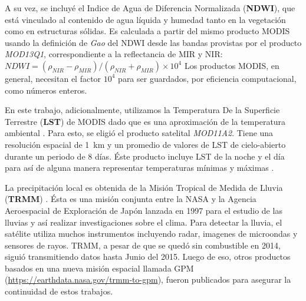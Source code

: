   \par A su vez, se incluyé el Indice de Agua de Diferencia Normalizada
    (\textbf{NDWI}), que está vinculado al contenido de agua líquida y humedad
    tanto en la vegetación como en estructuras sólidas.
    Es calculada a partir del mismo producto MODIS usando la definición de
    \textit{Gao} \cite{gao_ndwi} del NDWI desde las bandas provistas por
    el producto \textit{MOD13Q1}, correspondiente a la reflectancia de MIR y NIR:
    $NDWI =  (\rho_{NIR} - \rho_{MIR}) / (\rho_{NIR}  + \rho_{MIR} ) \times 10^4$
    Los productos MODIS, en general, necesitan el factor $10^{4}$ para ser guardados,
    por eficiencia computacional, como números enteros.

  \par En este trabajo, adicionalmente, utilizamos la Temperatura De la Superficie
    Terrestre (\textbf{LST}) de MODIS dado que es una aproximación de la
    temperatura ambiental \cite{infectious_diseases, surface_temp, temp_algorithm}.
    Para esto, se eligió el producto satelital \textit{MOD11A2}. Tiene una
    resolución espacial de \SI{1}{\kilo\meter} y un promedio de valores de
    LST de cielo-abierto durante un periodo de 8 días. Éste producto incluye
    LST de la noche y el día para así de alguna manera representar
    temperaturas mínimas y máximas \cite{lst_surface}.

  \par La precipitación local es obtenida de la Misión Tropical de Medida de Lluvia
    (\textbf{TRMM}) \cite{trmm_mision}. Ésta es una misión conjunta entre la
    NASA y la Agencia Aeroespacial de Exploración de Japón lanzada en 1997
    para el estudio de las lluvias y así realizar investigaciones sobre el
    clima. Para detectar la lluvia, el satélite utiliza muchos instrumentos
    incluyendo radar, imagenes de microondas y sensores de rayos. TRMM, a pesar
    de que se quedó sin combustible en 2014, siguió transmitiendo datos hasta
    Junio del 2015.
    Luego de eso, otros productos basados en una nueva misión espacial llamada
    GPM (\url{https://earthdata.nasa.gov/trmm-to-gpm}), fueron publicados para
    asegurar la continuidad de estos trabajos.


